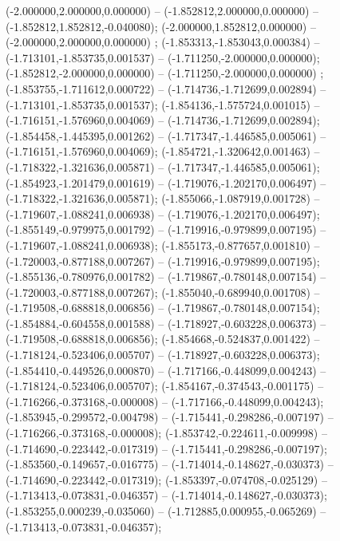  (-2.000000,2.000000,0.000000) -- (-1.852812,2.000000,0.000000) -- (-1.852812,1.852812,-0.040080);
 (-2.000000,1.852812,0.000000) -- (-2.000000,2.000000,0.000000) ;
 (-1.853313,-1.853043,0.000384) -- (-1.713101,-1.853735,0.001537) -- (-1.711250,-2.000000,0.000000);
 (-1.852812,-2.000000,0.000000) -- (-1.711250,-2.000000,0.000000) ;
 (-1.853755,-1.711612,0.000722) -- (-1.714736,-1.712699,0.002894) -- (-1.713101,-1.853735,0.001537);
 (-1.854136,-1.575724,0.001015) -- (-1.716151,-1.576960,0.004069) -- (-1.714736,-1.712699,0.002894);
 (-1.854458,-1.445395,0.001262) -- (-1.717347,-1.446585,0.005061) -- (-1.716151,-1.576960,0.004069);
 (-1.854721,-1.320642,0.001463) -- (-1.718322,-1.321636,0.005871) -- (-1.717347,-1.446585,0.005061);
 (-1.854923,-1.201479,0.001619) -- (-1.719076,-1.202170,0.006497) -- (-1.718322,-1.321636,0.005871);
 (-1.855066,-1.087919,0.001728) -- (-1.719607,-1.088241,0.006938) -- (-1.719076,-1.202170,0.006497);
 (-1.855149,-0.979975,0.001792) -- (-1.719916,-0.979899,0.007195) -- (-1.719607,-1.088241,0.006938);
 (-1.855173,-0.877657,0.001810) -- (-1.720003,-0.877188,0.007267) -- (-1.719916,-0.979899,0.007195);
 (-1.855136,-0.780976,0.001782) -- (-1.719867,-0.780148,0.007154) -- (-1.720003,-0.877188,0.007267);
 (-1.855040,-0.689940,0.001708) -- (-1.719508,-0.688818,0.006856) -- (-1.719867,-0.780148,0.007154);
 (-1.854884,-0.604558,0.001588) -- (-1.718927,-0.603228,0.006373) -- (-1.719508,-0.688818,0.006856);
 (-1.854668,-0.524837,0.001422) -- (-1.718124,-0.523406,0.005707) -- (-1.718927,-0.603228,0.006373);
 (-1.854410,-0.449526,0.000870) -- (-1.717166,-0.448099,0.004243) -- (-1.718124,-0.523406,0.005707);
 (-1.854167,-0.374543,-0.001175) -- (-1.716266,-0.373168,-0.000008) -- (-1.717166,-0.448099,0.004243);
 (-1.853945,-0.299572,-0.004798) -- (-1.715441,-0.298286,-0.007197) -- (-1.716266,-0.373168,-0.000008);
 (-1.853742,-0.224611,-0.009998) -- (-1.714690,-0.223442,-0.017319) -- (-1.715441,-0.298286,-0.007197);
 (-1.853560,-0.149657,-0.016775) -- (-1.714014,-0.148627,-0.030373) -- (-1.714690,-0.223442,-0.017319);
 (-1.853397,-0.074708,-0.025129) -- (-1.713413,-0.073831,-0.046357) -- (-1.714014,-0.148627,-0.030373);
 (-1.853255,0.000239,-0.035060) -- (-1.712885,0.000955,-0.065269) -- (-1.713413,-0.073831,-0.046357);
